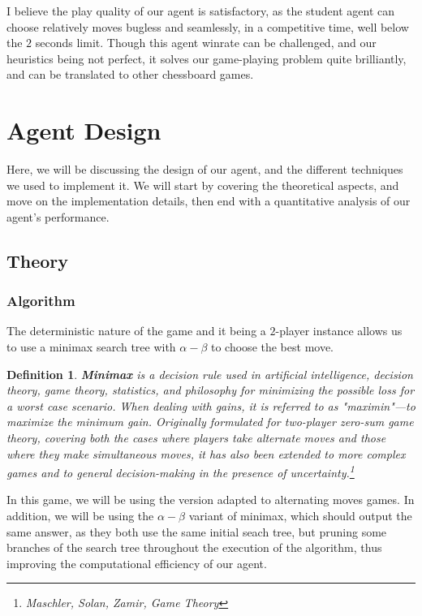 \documentclass[11pt]{article}
\newtheorem{definition}{Definition}[section]
\begin{document}
I believe the play quality of our agent is satisfactory, as the student agent can choose relatively moves bugless and seamlessly, in a competitive time, well below the $2$ seconds limit. 
Though this agent winrate can be challenged, and our heuristics being not perfect, it solves our game-playing problem quite brilliantly, and can be translated to other chessboard games.

\section{Agent Design}

Here, we will be discussing the design of our agent, and the different techniques we used to implement it. We will start by covering the theoretical aspects, and move on the implementation details, then end with a quantitative analysis of our agent's performance.

\subsection{Theory}

\subsubsection*{Algorithm}

The deterministic nature of the game and it being a $2$-player instance allows us to use a minimax search tree with $\alpha - \beta$ to choose the best move.

\begin{definition} \label{def:minimax}
    \textbf{Minimax} is a decision rule used in artificial intelligence, decision theory, game theory, statistics, and philosophy for minimizing the possible
     loss for a worst case scenario. When dealing with gains, it is referred to as "maximin"—to maximize the minimum gain. Originally formulated for two-player
      zero-sum game theory, covering both the cases where players take alternate moves and those where they make simultaneous moves, it has also been extended
       to more complex games and to general decision-making in the presence of uncertainty.\footnote{Maschler, Solan, Zamir, Game Theory}
    
\end{definition}

In this game, we will be using the version adapted to alternating moves games. In addition, we will be using the $\alpha - \beta$ variant of minimax,
which should output the same answer, as they both use the same initial seach tree, but pruning some branches of the search tree throughout the execution of the algorithm, thus improving the computational efficiency of our agent.
\end{document}
